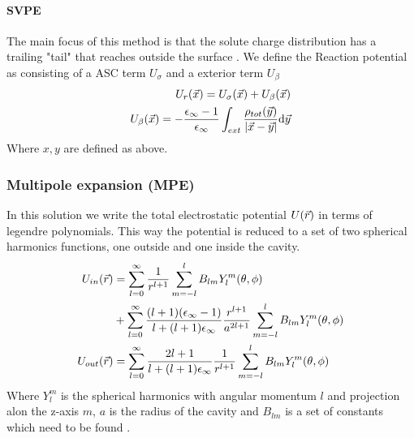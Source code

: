 \documentclass[../master_thesis.tex]{subfiles}
\begin{document}
\paragraph{\ac{SVPE}}
The main focus of this method is that the solute charge distribution has a trailing
"tail" that reaches outside the surface \cite{Tomasi:2005ipa}. We define the
Reaction potential as consisting of a \ac{ASC} term $U_{\sigma}$ and a exterior
term $U_{\beta}$
\begin{align}
  \begin{split}
    U_r(\vec{x}) = U_{\sigma}(\vec{x}) + U_{\beta}(\vec{x})\\
    U_{\beta}(\vec{x}) = -\frac{\epsilon_{\infty} - 1}{\epsilon_{\infty}}\int_{ext} \frac{\rho_{tot}(\vec{y})}{\abs{\vec{x} - \vec{y}}} \text{d}\vec{y}
  \end{split}
\end{align}
Where $x, y$ are defined as above.

\subsubsection{Multipole expansion (MPE)}
In this solution we write the total electrostatic potential $U(\vec{r})$ in terms
of legendre polynomials. This way the potential is reduced to a set of two
spherical harmonics functions, one outside and one inside the cavity.
\begin{align}
  \begin{split}
    U_{in}(\vec{r}) &= \sum_{l=0}^{\infty}\frac{1}{r^{l+1}}\sum^l_{m=-l}B_{lm}Y^m_l(\theta, \phi) \\
    &+ \sum_{l=0}^{\infty}\frac{(l+1)(\epsilon_{\infty} - 1)}{l + (l+1)\epsilon_{\infty}} \frac{r^{l+1}}{a^{2l+1}}\sum^l_{m=-l}B_{lm}Y^m_l(\theta, \phi)\\
    U_{out}(\vec{r}) &=\sum_{l=0}^{\infty}\frac{2l+1}{l+(l+1)\epsilon_{\infty}}\frac{1}{r^{l+1}}\sum^l_{m=-l}B_{lm}Y^m_l(\theta, \phi)
  \end{split}
\end{align}
Where $Y^m_l$ is the spherical harmonics with angular momentum $l$ and projection
alon the z-axis $m$, $a$ is the radius of the cavity and $B_{lm}$ is a set of
constants which need to be found \cite{Tomasi:1994wt}.
\end{document}

